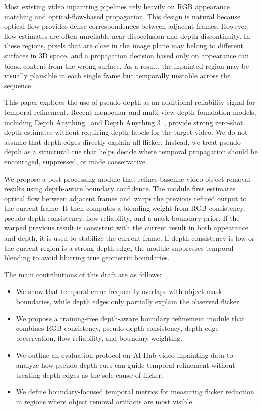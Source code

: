 \documentclass[nouppercase]{kaia}
\begin{document}
Most existing video inpainting pipelines rely heavily on RGB appearance matching and optical-flow-based propagation. This design is natural because optical flow provides dense correspondences between adjacent frames. However, flow estimates are often unreliable near disocclusion and depth discontinuity. In these regions, pixels that are close in the image plane may belong to different surfaces in 3D space, and a propagation decision based only on appearance can blend content from the wrong surface. As a result, the inpainted region may be visually plausible in each single frame but temporally unstable across the sequence.

This paper explores the use of pseudo-depth as an additional reliability signal for temporal refinement. Recent monocular and multi-view depth foundation models, including Depth Anything~\cite{yang2024depthanything} and Depth Anything 3~\cite{lin2025depthanything3}, provide strong zero-shot depth estimates without requiring depth labels for the target video. We do not assume that depth edges directly explain all flicker. Instead, we treat pseudo-depth as a structural cue that helps decide where temporal propagation should be encouraged, suppressed, or made conservative.

We propose a post-processing module that refines baseline video object removal results using depth-aware boundary confidence. The module first estimates optical flow between adjacent frames and warps the previous refined output to the current frame. It then computes a blending weight from RGB consistency, pseudo-depth consistency, flow reliability, and a mask-boundary prior. If the warped previous result is consistent with the current result in both appearance and depth, it is used to stabilize the current frame. If depth consistency is low or the current region is a strong depth edge, the module suppresses temporal blending to avoid blurring true geometric boundaries.

The main contributions of this draft are as follows:
\begin{itemize}
    \item We show that temporal error frequently overlaps with object mask boundaries, while depth edges only partially explain the observed flicker.
    \item We propose a training-free depth-aware boundary refinement module that combines RGB consistency, pseudo-depth consistency, depth-edge preservation, flow reliability, and boundary weighting.
    \item We outline an evaluation protocol on AI-Hub video inpainting data to analyze how pseudo-depth cues can guide temporal refinement without treating depth edges as the sole cause of flicker.
    \item We define boundary-focused temporal metrics for measuring flicker reduction in regions where object removal artifacts are most visible.
\end{itemize}
\end{document}
